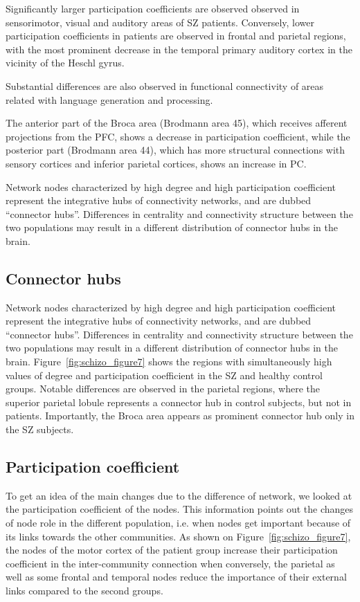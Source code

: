 Significantly larger participation coefficients are observed observed in sensorimotor, visual and auditory areas of SZ patients.
Conversely, lower participation coefficients in patients are observed in frontal and parietal regions, with the most prominent decrease in the temporal primary auditory cortex in the vicinity of the Heschl gyrus.

Substantial differences are also observed in functional connectivity of areas related with language generation and processing.

The anterior part of the Broca area (Brodmann area 45), which receives afferent projections from the PFC, shows a decrease in participation coefficient, while the posterior part (Brodmann area 44), which has more structural connections with sensory cortices and inferior parietal cortices, shows an increase in PC. 

Network nodes characterized by high degree and high participation coefficient represent the integrative hubs of connectivity networks, and are dubbed ``connector hubs''.
Differences in centrality and connectivity structure between the two populations may result in a different distribution of connector hubs in the brain.


\subsection{Connector hubs}
Network nodes characterized by high degree and high participation coefficient represent the integrative hubs of connectivity networks, and are dubbed ``connector hubs''.
Differences in centrality and connectivity structure between the two populations may result in a different distribution of connector hubs in the brain.
Figure~\ref{fig:schizo_figure7} shows the regions with simultaneously high values of degree and participation coefficient in the SZ and healthy control groups.
Notable differences are observed in the parietal regions, where the superior parietal lobule represents a connector hub in control subjects, but not in patients. Importantly, the Broca area appears as prominent connector hub only in the SZ subjects.

\subsection{Participation coefficient}
To get an idea of the main changes due to the difference of network, we looked at the participation coefficient of the nodes.
This information points out the changes of node role in the different population, i.e. when nodes get important because of its links towards the other communities.
As shown on Figure~\ref{fig:schizo_figure7}, the nodes of the motor cortex of the patient group increase their participation coefficient in the inter-community connection when conversely, the parietal as well as some frontal and temporal nodes reduce the importance of their external links compared to the second groups.

